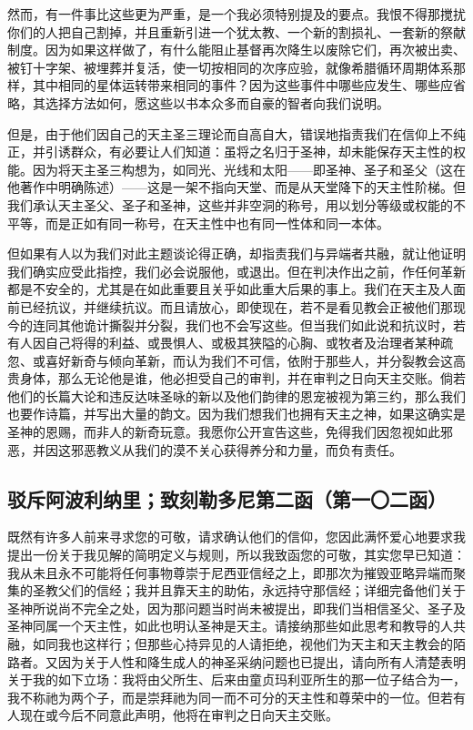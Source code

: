 然而，有一件事比这些更为严重，是一个我必须特别提及的要点。我恨不得那搅扰你们的人把自己割掉，并且重新引进一个犹太教、一个新的割损礼、一套新的祭献制度。因为如果这样做了，有什么能阻止基督再次降生以废除它们，再次被出卖、被钉十字架、被埋葬并复活，使一切按相同的次序应验，就像希腊循环周期体系那样，其中相同的星体运转带来相同的事件？因为这些事件中哪些应发生、哪些应省略，其选择方法如何，愿这些以书本众多而自豪的智者向我们说明。\par

但是，由于他们因自己的天主圣三理论而自高自大，错误地指责我们在信仰上不纯正，并引诱群众，有必要让人们知道：虽将之名归于圣神，却未能保存天主性的权能。因为将天主圣三构想为，如同光、光线和太阳——即圣神、圣子和圣父（这在他著作中明确陈述）——这是一架不指向天堂、而是从天堂降下的天主性阶梯。但我们承认天主圣父、圣子和圣神，这些并非空洞的称号，用以划分等级或权能的不平等，而是正如有同一称号，在天主性中也有同一性体和同一本体。\par

但如果有人以为我们对此主题谈论得正确，却指责我们与异端者共融，就让他证明我们确实应受此指控，我们必会说服他，或退出。但在判决作出之前，作任何革新都是不安全的，尤其是在如此重要且关乎如此重大后果的事上。我们在天主及人面前已经抗议，并继续抗议。而且请放心，即使现在，若不是看见教会正被他们那现今的连同其他诡计撕裂并分裂，我们也不会写这些。但当我们如此说和抗议时，若有人因自己将得的利益、或畏惧人、或极其狭隘的心胸、或牧者及治理者某种疏忽、或喜好新奇与倾向革新，而认为我们不可信，依附于那些人，并分裂教会这高贵身体，那么无论他是谁，他必担受自己的审判，并在审判之日向天主交账。倘若他们的长篇大论和违反达味圣咏的新以及他们韵律的恩宠被视为第三约，那么我们也要作诗篇，并写出大量的韵文。因为我们想我们也拥有天主之神，如果这确实是圣神的恩赐，而非人的新奇玩意。我愿你公开宣告这些，免得我们因忽视如此邪恶，并因这邪恶教义从我们的漠不关心获得养分和力量，而负有责任。\par


\subsection{驳斥阿波利纳里；致刻勒多尼第二函（第一〇二函）}

既然有许多人前来寻求您的可敬，请求确认他们的信仰，您因此满怀爱心地要求我提出一份关于我见解的简明定义与规则，所以我致函您的可敬，其实您早已知道：我从未且永不可能将任何事物尊崇于尼西亚信经之上，即那次为摧毁亚略异端而聚集的圣教父们的信经；我并且靠天主的助佑，永远持守那信经；详细完备他们关于圣神所说尚不完全之处，因为那问题当时尚未被提出，即我们当相信圣父、圣子及圣神同属一个天主性，如此也明认圣神是天主。请接纳那些如此思考和教导的人共融，如同我也这样行；但那些心持异见的人请拒绝，视他们为天主和天主教会的陌路者。又因为关于人性和降生成人的神圣采纳问题也已提出，请向所有人清楚表明关于我的如下立场：我将由父所生、后来由童贞玛利亚所生的那一位子结合为一，我不称祂为两个子，而是崇拜祂为同一而不可分的天主性和尊荣中的一位。但若有人现在或今后不同意此声明，他将在审判之日向天主交账。\par

